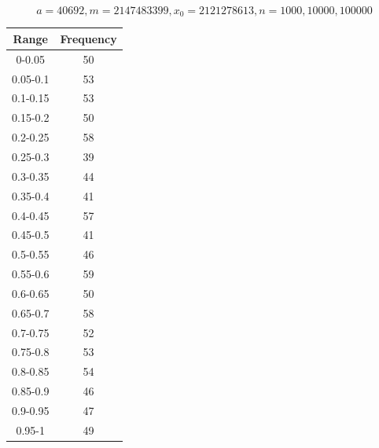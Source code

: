 \documentclass{article}
\begin{document}
\begin{table}

$$a = 40692, m = 2147483399, x_0 = 2121278613, n = 1000,10000,100000$$


\parbox{.3\linewidth}{
 \begin{tabular}{||c | c||}  \hline
		Range & Frequency \\ [0.5ex] \hline \hline0-0.05 & 50\\
		\hline 
		0.05-0.1 & 53\\
		\hline 
		0.1-0.15 & 53\\
		\hline 
		0.15-0.2 & 50\\
		\hline 
		0.2-0.25 & 58\\
		\hline 
		0.25-0.3 & 39\\
		\hline 
		0.3-0.35 & 44\\
		\hline 
		0.35-0.4 & 41\\
		\hline 
		0.4-0.45 & 57\\
		\hline 
		0.45-0.5 & 41\\
		\hline 
		0.5-0.55 & 46\\
		\hline 
		0.55-0.6 & 59\\
		\hline 
		0.6-0.65 & 50\\
		\hline 
		0.65-0.7 & 58\\
		\hline 
		0.7-0.75 & 52\\
		\hline 
		0.75-0.8 & 53\\
		\hline 
		0.8-0.85 & 54\\
		\hline 
		0.85-0.9 & 46\\
		\hline 
		0.9-0.95 & 47\\
		\hline 
		0.95-1 & 49\\
		\hline 
	\end{tabular} 

}
\parbox{.3\linewidth}{
	
}
\end{table}
\end{document}
